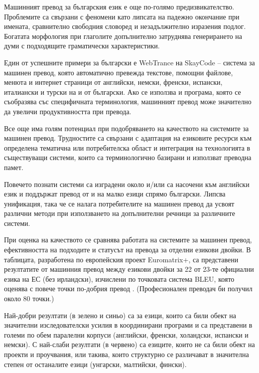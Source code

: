 \documentclass[]{../../metanetpaper}
\begin{document}
\begin{multicols}{2}
Машинният превод за българския език е още по-голямо предизвикателство. Проблемите са свързани с феномени като липсата на падежно окончание при имената, сравнително свободния словоред и незадължително изразения подлог. Богатата морфология при глаголите допълнително затруднява генерирането на думи с подходящите граматически характеристики.

Един от успешните примери за български е WebTrance на SkayCode – система за машинен превод, която автоматично превежда текстове, помощни файлове, менюта и интернет страници от английски, немски, френски, испански, италиански и турски на и от български. Ако се използва и програма, която се съобразява със специфичната терминология, машинният превод може значително да увеличи продуктивността при превода.

Все  още има голям потенциал при подобряването на качеството на системите за машинен превод. Трудностите са свързани с адаптация на езиковите ресурси към определена тематична или потребителска област и интеграция на технологията в
 съществуващи системи, които са терминологично базирани и използват преводна памет. 

Повечето познати системи са изградени около и/или са насочени към английски език и поддържат превод от и на малко езици спрямо български. Липсва унификация, така че се налага потребителите на машинен превод да усвоят
 различни методи при използването на допълнителни речници за различните системи.

При оценка на качеството се сравнява работата на системите за
 машинен превод, ефективността на подходите и статусът на превода за отделни
 езикови двойки. В таблицата, разработена по европейския проект
 Euromatrix+, са представени резултатите от машинния
 превод между езикови двойки за 22 от 23-те официални езика на ЕС
 (без ирландски), изчислени по точковата система BLEU, която оценява с повече точки по-добрия превод \cite{bleu1}. (Професионален преводач би получил около 80 точки.)

Най-добри резултати (в зелено и синьо) са за езици, които са били обект на значителни изследователски усилия в координирани програми и са представени в големи по обем паралелни корпуси (английски, френски, холандски, испански и немски). С най-слаби резултати (в червено) са езиците, които не са били обект на проекти и проучвания, или такива, които структурно се различават в значителна степен от останалите езици (унгарски, малтийски, фински).



\end{multicols}
\end{document}
